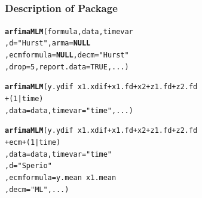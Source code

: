 \documentclass{beamer}\usepackage[]{graphicx}\usepackage[]{color}
\makeatletter
\newcommand{\hlnum}[1]{\textcolor[rgb]{0.686,0.059,0.569}{#1}}%
\newcommand{\hlstr}[1]{\textcolor[rgb]{0.192,0.494,0.8}{#1}}%
\newcommand{\hlopt}[1]{\textcolor[rgb]{0,0,0}{#1}}%
\newcommand{\hlstd}[1]{\textcolor[rgb]{0.345,0.345,0.345}{#1}}%
\newcommand{\hlkwa}[1]{\textcolor[rgb]{0.161,0.373,0.58}{\textbf{#1}}}%
\newcommand{\hlkwc}[1]{\textcolor[rgb]{0.333,0.667,0.333}{#1}}%
\newcommand{\hlkwd}[1]{\textcolor[rgb]{0.737,0.353,0.396}{\textbf{#1}}}%
\newenvironment{kframe}{%
 \def\at@end@of@kframe{}%
 \ifinner\ifhmode%
  \def\at@end@of@kframe{\end{minipage}}%
  \begin{minipage}{\columnwidth}%
 \fi\fi%
 \def\FrameCommand##1{\hskip\@totalleftmargin \hskip-\fboxsep
 \colorbox{shadecolor}{##1}\hskip-\fboxsep
     \hskip-\linewidth \hskip-\@totalleftmargin \hskip\columnwidth}%
 \MakeFramed {\advance\hsize-\width
   \@totalleftmargin\z@ \linewidth\hsize
   \@setminipage}}%
 {\par\unskip\endMakeFramed%
 \at@end@of@kframe}
\newenvironment{knitrout}{}{} %
\makeatother
\begin{document}
\subsection{}
\begin{frame}
\frametitle{Description of Package}
\begin{knitrout}
\color{fgcolor}\begin{kframe}
\begin{alltt}
\hlkwd{arfimaMLM}\hlstd{(formula, data, timevar}
          \hlstd{,} \hlkwc{d} \hlstd{=} \hlstr{"Hurst"}\hlstd{,} \hlkwc{arma} \hlstd{=} \hlkwa{NULL}
          \hlstd{,} \hlkwc{ecmformula} \hlstd{=} \hlkwa{NULL}\hlstd{,} \hlkwc{decm} \hlstd{=} \hlstr{"Hurst"}
          \hlstd{,} \hlkwc{drop} \hlstd{=} \hlnum{5}\hlstd{,} \hlkwc{report.data} \hlstd{=} \hlnum{TRUE}\hlstd{, ...)}
\end{alltt}
\end{kframe}
\end{knitrout}
\framebreak
\begin{knitrout}
\color{fgcolor}\begin{kframe}
\begin{alltt}
\hlkwd{arfimaMLM}\hlstd{(y.ydif} \hlopt{~} \hlstd{x1.xdif} \hlopt{+} \hlstd{x1.fd} \hlopt{+} \hlstd{x2} \hlopt{+} \hlstd{z1.fd} \hlopt{+} \hlstd{z2.fd}
          \hlopt{+} \hlstd{(}\hlnum{1} \hlopt{|} \hlstd{time)}
          \hlstd{,} \hlkwc{data} \hlstd{= data,} \hlkwc{timevar} \hlstd{=} \hlstr{"time"}\hlstd{, ...)}
\end{alltt}
\end{kframe}
\end{knitrout}
\framebreak
\begin{knitrout}
\color{fgcolor}\begin{kframe}
\begin{alltt}
\hlkwd{arfimaMLM}\hlstd{(y.ydif} \hlopt{~} \hlstd{x1.xdif} \hlopt{+} \hlstd{x1.fd} \hlopt{+} \hlstd{x2} \hlopt{+} \hlstd{z1.fd} \hlopt{+} \hlstd{z2.fd}
          \hlopt{+} \hlstd{ecm} \hlopt{+} \hlstd{(}\hlnum{1} \hlopt{|} \hlstd{time)}
          \hlstd{,} \hlkwc{data} \hlstd{= data,} \hlkwc{timevar} \hlstd{=} \hlstr{"time"}
          \hlstd{,} \hlkwc{d} \hlstd{=} \hlstr{"Sperio"}
          \hlstd{,} \hlkwc{ecmformula} \hlstd{= y.mean} \hlopt{~} \hlstd{x1.mean}
          \hlstd{,} \hlkwc{decm} \hlstd{=} \hlstr{"ML"}\hlstd{, ...)}
\end{alltt}

\end{kframe}
\end{knitrout}
\end{frame}
\end{document}
